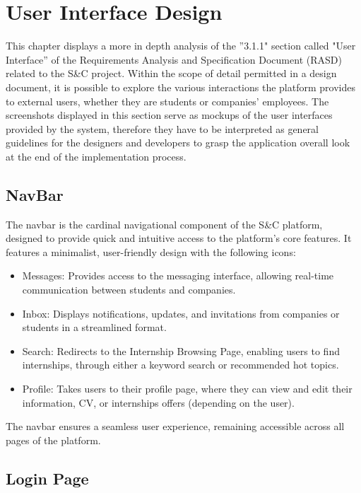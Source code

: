 \chapter{User Interface Design}
This chapter displays a more in depth analysis of the ”3.1.1" section called "User Interface” of the
 Requirements Analysis and
 Specification Document (RASD) related to the S\&C project. 
 Within the scope of detail permitted in a design document, 
 it is possible to explore the various interactions the platform provides to external users,
  whether they are students or companies' employees.
 The screenshots displayed in this section serve as mockups of the user interfaces provided by the system, 
 therefore they have to be interpreted as general guidelines for the designers and developers to
 grasp the application overall look at the end of the implementation process.



\section{NavBar}
The navbar is the cardinal navigational component of the S\&C platform, 
designed to provide quick and intuitive access to the platform's core features. 
It features a minimalist, user-friendly design with the following icons:  

\begin{itemize}
    \item Messages: Provides access to the messaging interface, 
    allowing real-time communication between students and companies.  
    \item Inbox: Displays notifications, updates, 
    and invitations from companies or students in a streamlined format.  
    \item Search: Redirects to the Internship Browsing Page,
    enabling users to find internships, through either a keyword search or recommended hot topics.
    \item Profile: Takes users to their profile page, 
    where they can view and edit their information, CV, or internships offers (depending on the user).  
\end{itemize}



The navbar ensures a seamless user experience, remaining accessible across all pages of the platform.

\section{Login Page}
